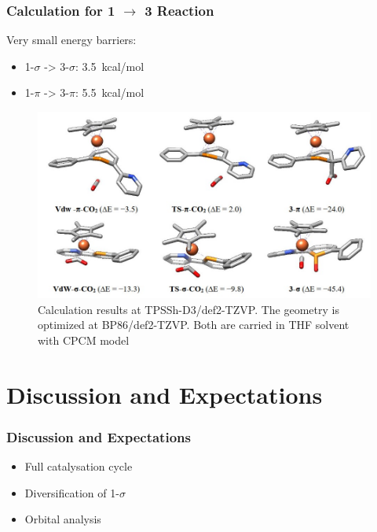 \documentclass[10pt,aspectratio=43]{beamer}
\numberwithin{equation}{section}
\begin{document}
\begin{frame}
\frametitle{Calculation for 1 $ \rightarrow $ 3 Reaction}
Very small energy barriers:
\begin{itemize}
	\item 1-$ \sigma $ -> 3-$ \sigma $: \SI{3.5}{kcal/mol}
	\item 1-$ \pi $ -> 3-$ \pi $: \SI{5.5}{kcal/mol}
\end{itemize}
\begin{figure}
	\includegraphics[width=0.85\linewidth]{33.jpg}
	\caption{Calculation results at TPSSh-D3/def2-TZVP. The geometry is optimized at BP86/def2-TZVP. Both are carried in THF solvent with CPCM model}
\end{figure}

\end{frame}



\section{Discussion and Expectations}
\begin{frame}
\frametitle{Discussion and Expectations}
\begin{itemize}
	\item Full catalysation cycle
	\item Diversification of 1-$ \sigma $
	\item Orbital analysis
\end{itemize}

\end{frame}
\end{document}
